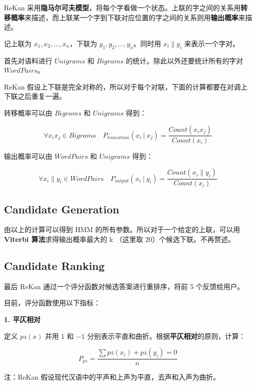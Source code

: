 \documentclass[12pt]{article}
\newcommand\given[1][]{\:#1\vert\:}
\begin{document}
ReKan 采用\textbf{隐马尔可夫模型}，将每个字看做一个状态。上联的字之间的关系用\textbf{转移概率}来描述，而上联某一个字到下联对应位置的字之间的关系则用\textbf{输出概率}来描述。

记上联为 $x_1, x_2, ..., x_n$，下联为 $y_1, y_2, ..., y_n$。同时用 $x_i \| y_i$ 来表示一个字对。

首先对语料进行 $Unigrams$ 和 $Bigrams$ 的统计。除此以外还要统计所有的字对 $WordPairs$。

ReKan 假设上下联是完全对称的，所以对于每个对联，下面的计算都要在对调上下联之后重复一遍。

转移概率可以由 $Bigrams$ 和 $Unigrams$ 得到：

\begin{equation}
\forall x_i x_j \in Bigrams \quad P_{transition}(x_i \given x_j) = \frac{Count(x_i x_j)}{Count(x_i)}
\end{equation}

输出概率可以由 $WordPairs$ 和 $Unigrams$ 得到：

\begin{equation}
\forall x_i \| y_i \in WordPairs \quad P_{output}(x_i \given y_i) = \frac{Count(x_i \| y_i)}{Count(x_i)}
\end{equation}

\subsection{Candidate Generation}

由以上的计算可以得到 HMM 的所有参数。所以对于一个给定的上联，可以用 \textbf{Viterbi 算法}求得输出概率最大的 k （这里取 20）个候选下联。不再赘述。

\subsection{Candidate Ranking}

最后 ReKan 通过一个评分函数对候选答案进行重排序，将前 5 个反馈给用户。

目前，评分函数使用以下指标：

\textbf{1. 平仄相对}

定义 $pz(x)$ 并用 $1$ 和 $-1$ 分别表示平直和曲折。根据\textbf{平仄相对}的原则，计算：

\begin{equation}
P_{pz} = \frac{\sum pz(x_i) + pz(y_i) = 0}{n}
\end{equation}

注：ReKan 假设现代汉语中的平声和上声为平直，去声和入声为曲折。
 
\end{document}
